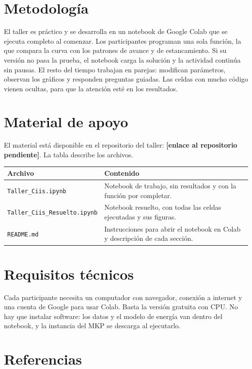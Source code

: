 \documentclass[11pt]{article}
\newcommand{\enlacerepo}{\textbf{[enlace al repositorio pendiente]}}
\begin{document}
\section{Metodología}

El taller es práctico y se desarrolla en un notebook de Google Colab que se ejecuta completo al comenzar. Los participantes programan una sola función, la que compara la curva con los patrones de avance y de estancamiento. Si su versión no pasa la prueba, el notebook carga la solución y la actividad continúa sin pausas. El resto del tiempo trabajan en parejas: modifican parámetros, observan los gráficos y responden preguntas guiadas. Las celdas con mucho código vienen ocultas, para que la atención esté en los resultados.

\section{Material de apoyo}

El material está disponible en el repositorio del taller: \enlacerepo. La tabla describe los archivos.

\begin{tabularx}{\textwidth}{@{}l X@{}}
\toprule
\textbf{Archivo} & \textbf{Contenido} \\
\midrule
\texttt{Taller\_Ciis.ipynb} & Notebook de trabajo, sin resultados y con la función por completar. \\
\texttt{Taller\_Ciis\_Resuelto.ipynb} & Notebook resuelto, con todas las celdas ejecutadas y sus figuras. \\
\texttt{README.md} & Instrucciones para abrir el notebook en Colab y descripción de cada sección. \\
\bottomrule
\end{tabularx}

\section{Requisitos técnicos}

Cada participante necesita un computador con navegador, conexión a internet y una cuenta de Google para usar Colab. Basta la versión gratuita con CPU. No hay que instalar software: los datos y el modelo de energía van dentro del notebook, y la instancia del MKP se descarga al ejecutarlo.

\section{Referencias}
\end{document}
